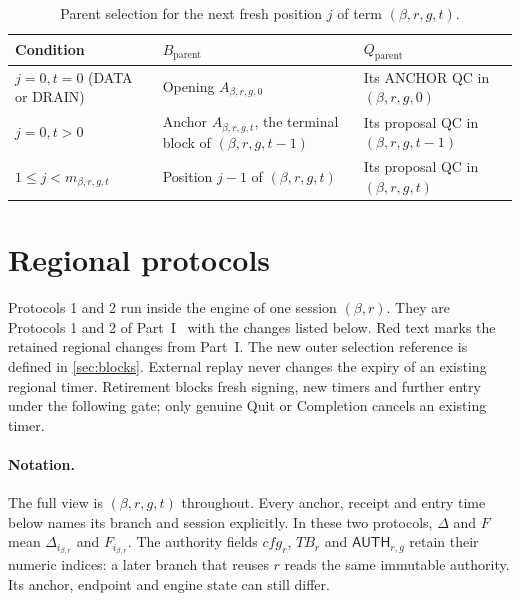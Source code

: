 \documentclass[11pt,a4paper]{article}
\newcommand{\RR}[1]{{\color{rrRed}#1}}
\newcommand{\TB}{\mathit{TB}}
\newcommand{\tagg}[1]{\ensuremath{\mathsf{#1}}}
\newcounter{protocol}
\begin{document}
\begin{table}[htbp]\centering\small
\caption{Parent selection for the next fresh position $j$ of term $(\beta,r,g,t)$.}
\label{tab:parent}
\begin{tabularx}{\linewidth}{@{}l Y Y@{}}
\toprule
Condition & $B_{\mathrm{parent}}$ & $Q_{\mathrm{parent}}$\\
\midrule
$j=0,t=0$ (DATA or DRAIN) & Opening $A_{\beta,r,g,0}$ & Its ANCHOR QC in $(\beta,r,g,0)$\\
$j=0,t>0$ & Anchor $A_{\beta,r,g,t}$, the terminal block of $(\beta,r,g,t-1)$ & Its proposal QC in $(\beta,r,g,t-1)$\\
$1\le j<m_{\beta,r,g,t}$ & Position $j-1$ of $(\beta,r,g,t)$ & Its proposal QC in $(\beta,r,g,t)$\\
\bottomrule
\end{tabularx}
\end{table}

\section{Regional protocols}
\label{sec:protocols}
Protocols 1 and 2 run inside the engine of one session $(\beta,r)$. They are
Protocols 1 and 2 of Part~I~\cite{part1} with the changes listed below.
\RR{Red text} marks the retained regional changes from Part~I.
The new outer selection reference is defined in \cref{sec:blocks}.
External replay never changes the expiry of an existing regional timer.
Retirement blocks fresh signing, new timers and further entry under the
following gate; only genuine Quit or Completion cancels an existing timer.

\paragraph{Notation.}
The full view is $(\beta,r,g,t)$ throughout. Every anchor, receipt and
entry time below names its branch and session explicitly. In these two
protocols, $\Delta$ and $F$ mean $\Delta_{i_{\beta,r}}$ and
$F_{i_{\beta,r}}$. The authority fields $\mathit{cfg}_r$, $\TB_r$ and
$\tagg{AUTH}_{r,g}$ retain their numeric indices: a later branch that
reuses $r$ reads the same immutable authority. Its anchor, endpoint and
engine state can still differ.
\end{document}
